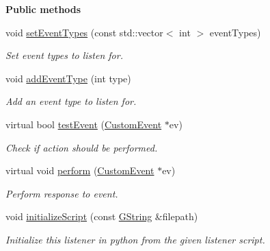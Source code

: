 \begin{Indent}\textbf{ Public methods}\par
\begin{DoxyCompactItemize}
\item 
void \mbox{\hyperlink{classrev_1_1_event_listener_a0f3261f5c3856571f3fc16ebee61b725}{set\+Event\+Types}} (const std\+::vector$<$ int $>$ event\+Types)
\begin{DoxyCompactList}\small\item\em Set event types to listen for. \end{DoxyCompactList}\item 
void \mbox{\hyperlink{classrev_1_1_event_listener_ac7d395e1e2f55c894b44c49bade80262}{add\+Event\+Type}} (int type)
\begin{DoxyCompactList}\small\item\em Add an event type to listen for. \end{DoxyCompactList}\item 
\mbox{\label{classrev_1_1_event_listener_a663a82803af22a90ed8290e081e3f300}} 
virtual bool \mbox{\hyperlink{classrev_1_1_event_listener_a663a82803af22a90ed8290e081e3f300}{test\+Event}} (\mbox{\hyperlink{classrev_1_1_custom_event}{Custom\+Event}} $\ast$ev)
\begin{DoxyCompactList}\small\item\em Check if action should be performed. \end{DoxyCompactList}\item 
\mbox{\label{classrev_1_1_event_listener_ae479e874dbdde605dcf1da01391cbf97}} 
virtual void \mbox{\hyperlink{classrev_1_1_event_listener_ae479e874dbdde605dcf1da01391cbf97}{perform}} (\mbox{\hyperlink{classrev_1_1_custom_event}{Custom\+Event}} $\ast$ev)
\begin{DoxyCompactList}\small\item\em Perform response to event. \end{DoxyCompactList}\item 
\mbox{\label{classrev_1_1_event_listener_ac33288305683b76e6559b743916410a0}} 
void \mbox{\hyperlink{classrev_1_1_event_listener_ac33288305683b76e6559b743916410a0}{initialize\+Script}} (const \mbox{\hyperlink{classrev_1_1_g_string}{G\+String}} \&filepath)
\begin{DoxyCompactList}\small\item\em Initialize this listener in python from the given listener script. \end{DoxyCompactList}\end{DoxyCompactItemize}
\end{Indent}
